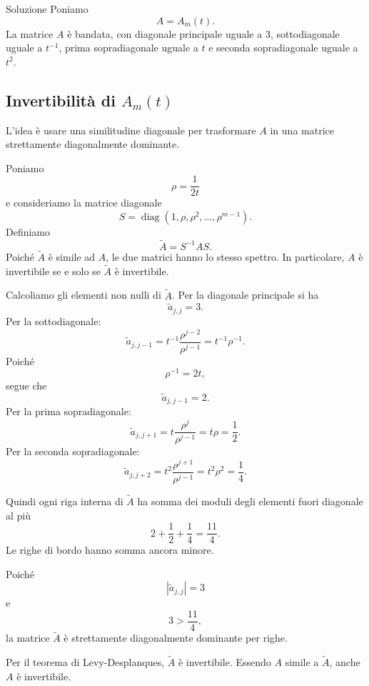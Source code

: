 \documentclass[a4paper]{article}
\begin{document}
\begin{snippetsolution}{Soluzione}
    Poniamo
    \[
        A=A_m(t).
    \]
    La matrice \(A\) è bandata, con diagonale principale uguale a \(3\), sottodiagonale uguale a \(t^{-1}\), prima sopradiagonale uguale a \(t\) e seconda sopradiagonale uguale a \(t^2\).

    \subsection*{Invertibilità di \(A_m(t)\)}

    L'idea è usare una similitudine diagonale per trasformare \(A\) in una matrice strettamente diagonalmente dominante.

    Poniamo
    \[
        \rho=\frac{1}{2t}
    \]
    e consideriamo la matrice diagonale
    \[
        S=\operatorname{diag}(1,\rho,\rho^2,\dots,\rho^{m-1}).
    \]
    Definiamo
    \[
        \widetilde A=S^{-1}AS.
    \]
    Poiché \(\widetilde A\) è simile ad \(A\), le due matrici hanno lo stesso spettro. In particolare, \(A\) è invertibile se e solo se \(\widetilde A\) è invertibile.

    Calcoliamo gli elementi non nulli di \(\widetilde A\). Per la diagonale principale si ha
    \[
        \widetilde a_{j,j}=3.
    \]
    Per la sottodiagonale:
    \[
        \widetilde a_{j,j-1}
        =
        t^{-1}\frac{\rho^{j-2}}{\rho^{j-1}}
        =
        t^{-1}\rho^{-1}.
    \]
    Poiché
    \[
        \rho^{-1}=2t,
    \]
    segue che
    \[
        \widetilde a_{j,j-1}=2.
    \]
    Per la prima sopradiagonale:
    \[
        \widetilde a_{j,j+1}
        =
        t\frac{\rho^j}{\rho^{j-1}}
        =
        t\rho
        =
        \frac12.
    \]
    Per la seconda sopradiagonale:
    \[
        \widetilde a_{j,j+2}
        =
        t^2\frac{\rho^{j+1}}{\rho^{j-1}}
        =
        t^2\rho^2
        =
        \frac14.
    \]

    Quindi ogni riga interna di \(\widetilde A\) ha somma dei moduli degli elementi fuori diagonale al più
    \[
        2+\frac12+\frac14=\frac{11}{4}.
    \]
    Le righe di bordo hanno somma ancora minore.

    Poiché
    \[
        |\widetilde a_{j,j}|=3
    \]
    e
    \[
        3>\frac{11}{4},
    \]
    la matrice \(\widetilde A\) è strettamente diagonalmente dominante per righe.

    Per il teorema di Levy-Desplanques, \(\widetilde A\) è invertibile. Essendo \(A\) simile a \(\widetilde A\), anche \(A\) è invertibile.


\end{snippetsolution}
\end{document}
